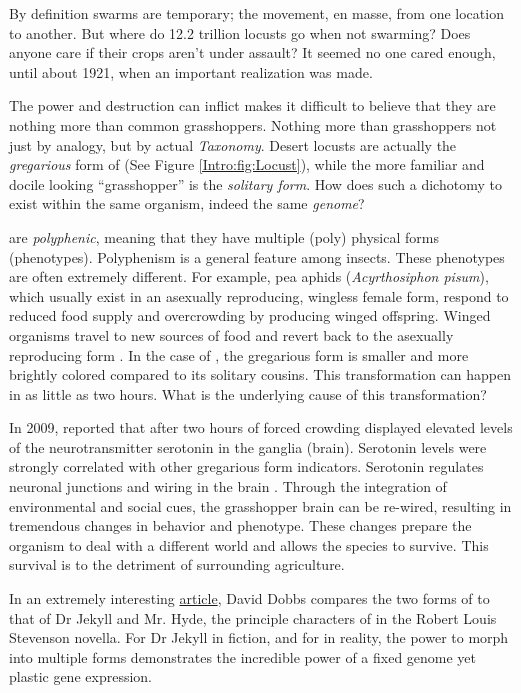   By definition swarms are temporary; the movement, en masse, from one location to another. But where do 12.2 trillion locusts go when not swarming? Does anyone care if their crops aren't under assault? It seemed no one cared enough, until about 1921, when an important realization was made.

  The power and destruction \locusts{} can inflict makes it difficult to believe that they are nothing more than common grasshoppers. Nothing more than grasshoppers not just by analogy, but by actual \textit{Taxonomy}. Desert locusts are actually the \textit{gregarious} form  of \locusts{} (See Figure \ref{Intro:fig:Locust}), while the more familiar and docile looking ``grasshopper'' is the \textit{solitary form}. How does such a dichotomy to exist within the same organism, indeed the same \textit{genome}?

  \locusts{} are \textit{polyphenic}, meaning that they have multiple (poly) physical forms (phenotypes). Polyphenism is a general feature among insects. These phenotypes are often extremely different. For example, pea aphids (\textit{Acyrthosiphon pisum}), which usually exist in an asexually reproducing, wingless female form, respond to reduced food supply and overcrowding by producing winged offspring. Winged organisms travel to new sources of food and revert back to the asexually reproducing form \citep{Shingleton2003,Purandare2014b}. In the case of \locusts{}, the gregarious form is smaller and more brightly colored compared to its solitary cousins. This transformation can happen in as little as two hours. What is the underlying cause of this transformation?

  In 2009, \citet{Anstey2009} reported that after two hours of forced crowding \locusts{} displayed elevated levels of the neurotransmitter serotonin in the ganglia (brain). Serotonin levels were strongly correlated with other gregarious form indicators. Serotonin regulates neuronal junctions and wiring in the brain \citep{Hoeffer2003}. Through the integration of environmental and social cues, the grasshopper brain can be re-wired, resulting in tremendous changes in behavior and phenotype. These changes prepare the organism to deal with a different world and allows the species to survive. This survival is to the detriment of surrounding agriculture.

  In an extremely interesting \href{http://aeon.co/magazine/nature-and-cosmos/why-its-time-to-lay-the-selfish-gene-to-rest/}{article}, David Dobbs compares the two forms of \locusts{} to that of Dr Jekyll and Mr. Hyde, the principle characters of in the Robert Louis Stevenson novella. For Dr Jekyll in fiction, and for \locusts{} in reality, the power to morph into multiple forms demonstrates the incredible power of a fixed genome yet plastic gene expression. 

